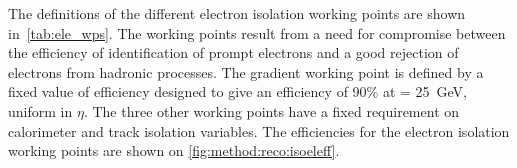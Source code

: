 The definitions of the different electron isolation working points are shown in~\cref{tab:ele_wps}. The working points result from a need for compromise between the efficiency of identification of prompt electrons and a good rejection of electrons from hadronic processes. The gradient working point is defined by a fixed value of efficiency designed to give an efficiency of 90\% at \pt = \SI{25}{\giga\electronvolt}, uniform in $\eta$. The three other working points have a fixed requirement on calorimeter and track isolation variables. The efficiencies for the electron isolation working points are shown on \cref{fig:method:reco:isoeleff}.

\begin{table}[]
  \centering
  \caption[Definition of the electron isolation working points and isolation efficiency $\epsilon$.]{Definition of the electron isolation working points and isolation efficiency $\epsilon$.
    In the Gradient working point definition, the unit of \pt is \SI{}{\giga\electronvolt}. All working points use a cone size
    of $\Delta R = 0.2$ for calorimeter isolation and $\Delta R_{\mathrm{max}} = 0.2$ for track isolation~\cite{Aad:2019tso}.}
  \label{tab:ele_wps}
\end{table}

